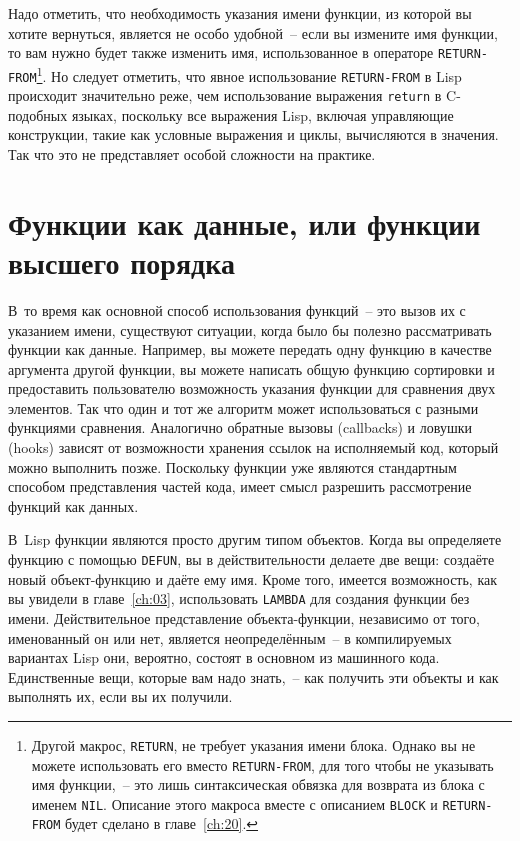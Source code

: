Надо отметить, что необходимость указания имени функции, из которой вы хотите вернуться,
является не особо удобной~-- если вы измените имя функции, то вам нужно будет также
изменить имя, использованное в операторе \lstinline{RETURN-FROM}\footnote{Другой макрос,
  \lstinline{RETURN}, не требует указания имени блока.  Однако вы не можете использовать его
  вместо \lstinline{RETURN-FROM}, для того чтобы не указывать имя функции,~-- это лишь
  синтаксическая обвязка для возврата из блока с именем \lstinline{NIL}.  Описание этого
  макроса вместе с описанием \lstinline{BLOCK} и \lstinline{RETURN-FROM} будет сделано в
  главе~\ref{ch:20}.}\hspace{\footnotenegspace}.  Но следует отметить, что явное использование
  \lstinline{RETURN-FROM} в Lisp происходит значительно реже, чем использование
  выражения \lstinline{return} в C-подобных языках, поскольку
все выражения Lisp, включая управляющие конструкции, такие как условные выражения и циклы,
вычисляются в значения.  Так что это не представляет особой сложности на практике.

\section{Функции как данные, или функции высшего порядка}

В~то время как основной способ использования функций~-- это вызов их с указанием имени,
существуют ситуации, когда было бы полезно рассматривать функции как данные.  Например, вы
можете передать одну функцию в качестве аргумента другой функции, вы можете написать общую
функцию сортировки и предоставить пользователю возможность указания функции для сравнения
двух элементов.  Так что один и тот же алгоритм может использоваться с разными функциями
сравнения.  Аналогично обратные вызовы (callbacks) и ловушки (hooks) зависят от
возможности хранения ссылок на исполняемый код, который можно выполнить позже.  Поскольку
функции уже являются стандартным способом представления частей кода, имеет смысл разрешить
рассмотрение функций как данных.

В~Lisp функции являются просто другим типом объектов.  Когда вы определяете функцию с
помощью \lstinline{DEFUN}, вы в действительности делаете две вещи: создаёте новый
объект-функцию и даёте ему имя.  Кроме того, имеется возможность, как вы увидели в
главе~\ref{ch:03}, использовать \lstinline{LAMBDA} для создания функции без имени.
Действительное представление объекта-функции, независимо от того, именованный он или нет,
является неопределённым~-- в компилируемых вариантах Lisp они, вероятно, состоят в
основном из машинного кода.  Единственные вещи, которые вам надо знать,~-- как получить
эти объекты и как выполнять их, если вы их получили.

